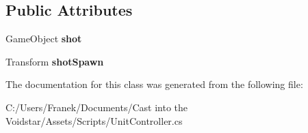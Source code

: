 \subsection*{Public Attributes}
\begin{DoxyCompactItemize}
\item 
\hypertarget{class_unit_controller_a8fb130f3cd6edb7e866cfa1053c3d524}{}Game\+Object {\bfseries shot}\label{class_unit_controller_a8fb130f3cd6edb7e866cfa1053c3d524}

\item 
\hypertarget{class_unit_controller_a24e925167637d0e1d2220d62bb9cb964}{}Transform {\bfseries shot\+Spawn}\label{class_unit_controller_a24e925167637d0e1d2220d62bb9cb964}

\end{DoxyCompactItemize}


The documentation for this class was generated from the following file\+:\begin{DoxyCompactItemize}
\item 
C\+:/\+Users/\+Franek/\+Documents/\+Cast into the Voidstar/\+Assets/\+Scripts/Unit\+Controller.\+cs\end{DoxyCompactItemize}
